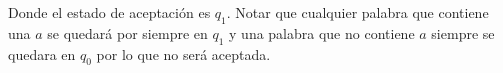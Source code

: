 \documentclass[letterpaper,10pt]{article}
\theoremstyle{plain}
\begin{document}
\begin{enumerate}[\bf P1.]
\begin{enumerate}
        Donde el estado de aceptación es $q_1$. Notar que cualquier palabra que contiene una $a$ se quedará por siempre en $q_1$ y una palabra que no contiene $a$ siempre se quedara en $q_0$ por lo que no será aceptada.
    \end{enumerate}
\end{enumerate}
\end{document}
